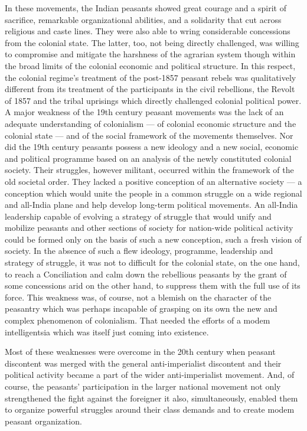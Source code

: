 In these movements, the Indian peasants showed great courage and a spirit of sacrifice, remarkable organizational abilities, and a solidarity that cut across religious and caste lines. They were also able to wring considerable concessions from the colonial state. The latter, too, not being directly challenged, was willing to compromise and mitigate the harshness of the agrarian system though within the broad limits of the colonial economic and political structure. In this respect, the colonial regime’s treatment of the post-1857 peasant rebels was qualitatively different from its treatment of the participants in the civil rebellions, the Revolt of 1857 and the tribal uprisings which directly challenged colonial political power. A major weakness of the 19th century peasant movements was the lack of an adequate understanding of colonialism — of colonial economic structure and the colonial state — and of the social framework of the movements themselves. Nor did the 19th century peasants possess a new ideology and a new social, economic and political programme based on an analysis of the newly constituted colonial society. Their struggles, however militant, occurred within the framework of the old societal order. They lacked a positive conception of an alternative society — a conception which would unite the people in a common struggle on a wide regional and all-India plane and help develop long-term political movements. An all-India leadership capable of evolving a strategy of struggle that would unify and mobilize peasants and other sections of society for nation-wide political activity could be formed only on the basis of such a new conception, such a fresh vision of society. In the absence of such a flew ideology, programme, leadership and strategy of struggle, it was not to difficult for the colonial state, on the one hand, to reach a Conciliation and calm down the rebellious peasants by the grant of some concessions arid on the other hand, to suppress them with the full use of its force. This weakness was, of course, not a blemish on the character of the peasantry which was perhaps incapable of grasping on its own the new and complex phenomenon of colonialism. That needed the efforts of a modem intelligentsia which was itself just coming into existence.

Most of these weaknesses were overcome in the 20th century when peasant discontent was merged with the general anti-imperialist discontent and their political activity became a part of the wider anti-imperialist movement. And, of course, the peasants’ participation in the larger national movement not only strengthened the fight against the foreigner it also, simultaneously, enabled them to organize powerful struggles around their class demands and to create modem peasant organization.
